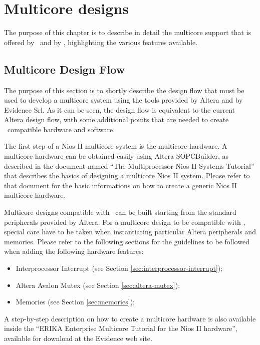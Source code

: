 \chapter[Multicore designs]{Multicore designs}
\label{cha:multicore}

The purpose of this chapter is to describe in detail the multicore
support that is offered by \ee\ and by \rtd, highlighting the various
features available.




\section[Multicore Design Flow]
{Multicore Design Flow}
\label{sec:multicore-designflow}

The purpose of this section is to shortly describe the design flow
that must be used to develop a multicore system using the tools
provided by Altera and by Evidence Srl. As it can be seen, the design
flow is equivalent to the current Altera design flow, with some
additional points that are needed to create \ee\ compatible hardware
and software.

The first step of a Nios II multicore system is the multicore
hardware. A multicore hardware can be obtained easily using Altera
SOPCBuilder, as described in the document named ``The Multiprocessor
Nios II Systems Tutorial'' \cite{Altera-multicpu-tutorial} that
describes the basics of designing a multicore Nios II system. Please
refer to that document for the basic informations on how to create a
generic Nios II multicore hardware.

Multicore designs compatible with \ee\ can be built starting from the
standard peripherals provided by Altera. For a multicore design to be
compatible with \ee, special care have to be taken when instantiating
particular Altera peripherals and memories. Please refer to the
following sections for the guidelines to be followed when adding the
following hardware features:
\begin{itemize}
\item Interprocessor Interrupt (see Section
  \ref{sec:interprocessor-interrupt});
\item Altera Avalon Mutex (see Section \ref{sec:altera-mutex});
\item Memories (see Section \ref{sec:memories});
\end{itemize}

A step-by-step description on how to create a multicore hardware is
also available inside the ``ERIKA Enterprise Multicore Tutorial for
the Nios II hardware'', available for download at the Evidence web
site.

